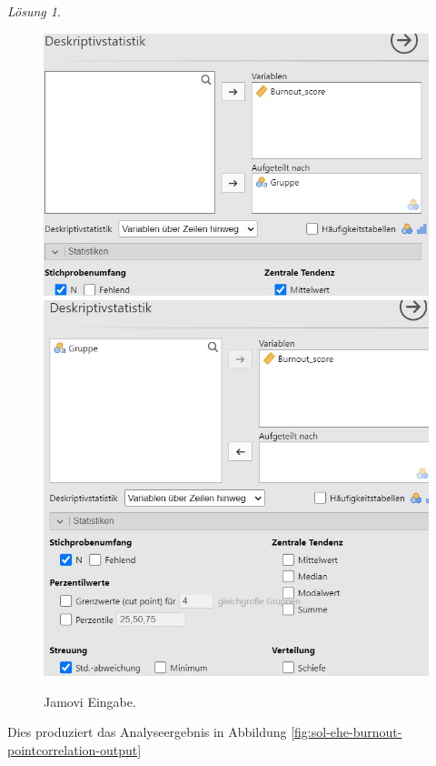 \documentclass[
]{book}
\theoremstyle{definition}
\theoremstyle{definition}
\theoremstyle{definition}
\theoremstyle{definition}
\theoremstyle{remark}
\newtheorem*{solution}{Lösung}
\begin{document}
\begin{solution}
\begin{figure}
{\centering \includegraphics[height=0.5\textheight]{figures/08-exr-ehe-burnout-pointcorrelation-jmv-input1} \includegraphics[height=0.5\textheight]{figures/08-exr-ehe-burnout-pointcorrelation-jmv-input2} 

}

\caption{Jamovi Eingabe.}\label{fig:sol-ehe-burnout-pointcorrelation-input}
\end{figure}

Dies produziert das Analyseergebnis in Abbildung \ref{fig:sol-ehe-burnout-pointcorrelation-output}


\end{solution}
\end{document}
